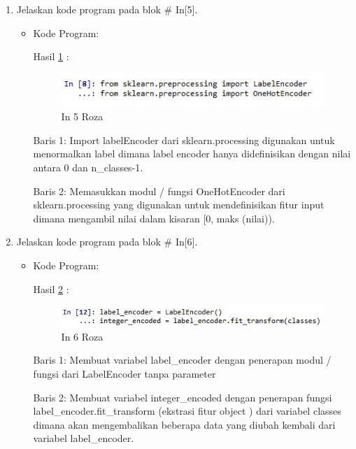 \begin{enumerate}
\item Jelaskan kode program pada blok \# In[5].
\begin{itemize}
\item Kode Program:

\par Hasil \ref{in5roza} :
\begin{figure}[!hbtp]
\centering
\includegraphics[scale=0.7]{figures/prak5roza.jpg}
\caption{In 5 Roza}
\label{in5roza}
\end{figure}
\par Baris 1: Import labelEncoder dari sklearn.processing digunakan untuk menormalkan label dimana label encoder hanya didefinisikan dengan nilai antara 0 dan n\_classes-1.
\par Baris 2: Memasukkan modul / fungsi OneHotEncoder dari sklearn.processing yang digunakan untuk mendefinisikan fitur input dimana mengambil nilai dalam kisaran [0, maks (nilai)).
\end{itemize}
\par

\item Jelaskan kode program pada blok \# In[6].
\begin{itemize}
\item Kode Program:

\par Hasil \ref{in6roza} :
\begin{figure}[!hbtp]
\centering
\includegraphics[scale=0.7]{figures/prak6roza.jpg}
\caption{In 6 Roza}
\label{in6roza}
\end{figure}
\par Baris 1: Membuat variabel label\_encoder dengan penerapan modul / fungsi dari LabelEncoder tanpa parameter
\par Baris 2: Membuat variabel integer\_encoded dengan penerapan fungsi label\_encoder.fit\_transform (ekstrasi fitur object ) dari variabel classes dimana akan mengembalikan beberapa data yang diubah kembali dari variabel label\_encoder.
\end{itemize}
\par


\end{enumerate}
